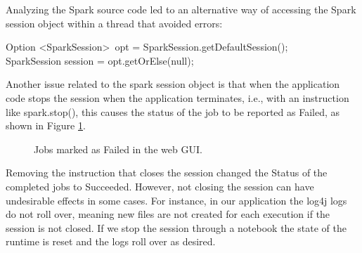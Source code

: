 Analyzing the Spark source code led to an alternative way of accessing the Spark session object within a thread that avoided errors:

\vspace{0.5cm}
\noindent Option \textless SparkSession\textgreater \ opt = SparkSession.getDefaultSession();\\
SparkSession session = opt.getOrElse(null);
\vspace{0.5cm}

Another issue related to the spark session object is that when the application code stops the session when the application terminates, i.e., with an instruction like spark.stop(), this causes the status of the job to be reported as Failed, as shown in Figure \ref{fig:databricksJobsFailed}.

\begin{figure}
   \begin{center}
   \end{center}
   \caption{Jobs marked as Failed in the web GUI.}
   \label{fig:databricksJobsFailed}
\end{figure}

Removing the instruction that closes the session changed the Status of the completed jobs to Succeeded. However, not closing the session can have undesirable effects in some cases. For instance, in our application the log4j logs do not roll over, meaning new files are not created for each execution if the session is not closed. If we stop the session through a notebook the state of the runtime is reset and the logs roll over as desired.

